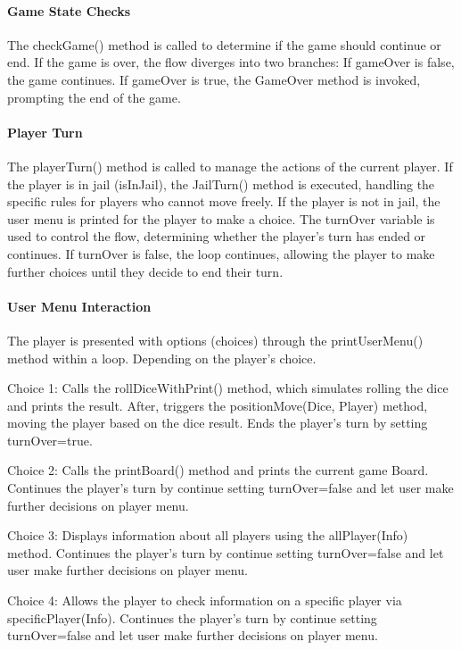 \documentclass{article}
\begin{document}
\paragraph{Game State Checks}
The checkGame() method is called to determine if the game should continue or end.
If the game is over, the flow diverges into two branches:
If gameOver is false, the game continues.
If gameOver is true, the GameOver method is invoked, prompting the end of the game.

\paragraph{Player Turn}
The playerTurn() method is called to manage the actions of the current player.
If the player is in jail (isInJail), the JailTurn() method is executed, handling the specific rules for players who cannot move freely.
If the player is not in jail, the user menu is printed for the player to make a choice.
The turnOver variable is used to control the flow, determining whether the player's turn has ended or continues.
If turnOver is false, the loop continues, allowing the player to make further choices until they decide to end their turn.

\paragraph{User Menu Interaction}
The player is presented with options (choices) through the printUserMenu() method within a loop.
Depending on the player's choice.

Choice 1: Calls the rollDiceWithPrint() method, which simulates rolling the dice and prints the result. After, triggers the positionMove(Dice, Player) method, moving the player based on the dice result. Ends the player's turn by setting turnOver=true.

Choice 2: Calls the printBoard() method and prints the current game Board. Continues the player's turn by continue setting turnOver=false and let user make further decisions on player menu.

Choice 3: Displays information about all players using the allPlayer(Info) method. Continues the player's turn by continue setting turnOver=false and let user make further decisions on player menu.

Choice 4: Allows the player to check information on a specific player via specificPlayer(Info). Continues the player's turn by continue setting turnOver=false and let user make further decisions on player menu.
\end{document}
